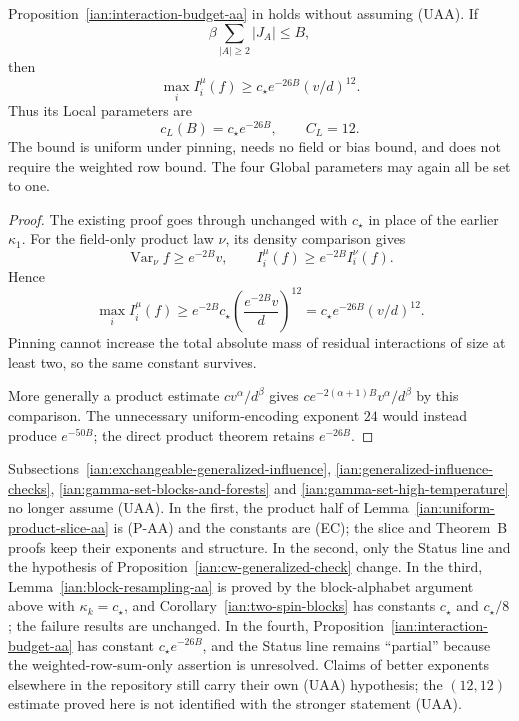 \begin{proposition}
\label{ian:influence-consequences-budget}
Proposition~\ref{ian:interaction-budget-aa} in
 holds without
assuming (UAA). If
\[
 \beta\sum_{|A|\ge2}|J_A|\le B,
\]
then
\[
 \max_iI_i^\mu(f)
 \ge c_\star e^{-26B}(v/d)^{12}.
\]
Thus its Local parameters are
\[
 c_L(B)=c_\star e^{-26B},\qquad C_L=12.
\]
The bound is uniform under pinning, needs no field or bias bound,
and does not require the weighted row bound.
The four Global parameters may again all be set to one.
\end{proposition}

\begin{proof}
The existing proof goes through unchanged with \(c_\star\) in place
of the earlier \(\kappa_1\).
For the field-only product law \(\nu\), its density comparison gives
\[
 \operatorname{Var}_\nu f\ge e^{-2B}v,\qquad
 I_i^\mu(f)\ge e^{-2B}I_i^\nu(f).
\]
Hence
\[
 \max_iI_i^\mu(f)
 \ge e^{-2B}c_\star
       \left(\frac{e^{-2B}v}{d}\right)^{12}
 =c_\star e^{-26B}(v/d)^{12}.
\]
Pinning cannot increase the total absolute mass of residual
interactions of size at least two, so the same constant survives.

More generally a product estimate \(cv^\alpha/d^\beta\) gives
\(ce^{-2(\alpha+1)B}v^\alpha/d^\beta\) by this comparison.
The unnecessary uniform-encoding exponent \(24\) would instead
produce \(e^{-50B}\); the direct product theorem retains \(e^{-26B}\).
\end{proof}

\begin{remark}
\label{ian:influence-consequences-status}
Subsections~\ref{ian:exchangeable-generalized-influence},
\ref{ian:generalized-influence-checks},
\ref{ian:gamma-set-blocks-and-forests} and
\ref{ian:gamma-set-high-temperature} no longer assume (UAA).
In the first, the product half of
Lemma~\ref{ian:uniform-product-slice-aa} is (P-AA) and the
constants are (EC); the slice and Theorem~B proofs keep their
exponents and structure. In the second, only the Status line and
the hypothesis of Proposition~\ref{ian:cw-generalized-check} change.
In the third, Lemma~\ref{ian:block-resampling-aa} is proved by the
block-alphabet argument above with \(\kappa_k=c_\star\), and
Corollary~\ref{ian:two-spin-blocks} has constants \(c_\star\) and
\(c_\star/8\); the failure results are unchanged. In the fourth,
Proposition~\ref{ian:interaction-budget-aa} has constant
\(c_\star e^{-26B}\), and the Status line remains ``partial''
because the weighted-row-sum-only assertion is unresolved.
Claims of better exponents elsewhere in the repository still carry
their own (UAA) hypothesis; the \((12,12)\) estimate proved here is
not identified with the stronger statement (UAA).
\end{remark}
